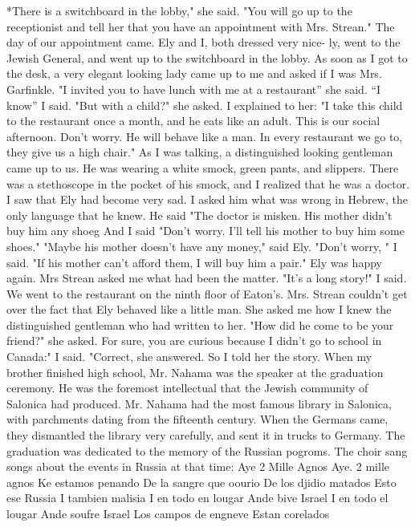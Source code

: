 *There is a switchboard in the lobby," she said. "You will go up 
to the receptionist and tell her that you have an appointment with Mrs. 
Strean." 
The day of our appointment came. Ely and I, both dressed very nice-
ly, went to the Jewish General, and went up to the switchboard in the 
lobby. As soon as I got to the desk, a very elegant looking lady came 
up to me and asked if I was Mrs. Garfinkle. 
"I invited you to have lunch with me at a restaurant” she said.
“I know” I said.
"But with a child?" she asked. 
I explained to her: "I take this child to the restaurant once a 
month, and he eats like an adult. This is our social afternoon. Don't 
worry. He will behave like a man. In every restaurant we go to, they 
give us a high chair." 
As I was talking, a distinguished looking gentleman came up to us.
He was wearing a white smock, green pants, and slippers. There was a 
stethoscope in the pocket of his smock, and I realized that he was a 
doctor. 
I saw that Ely had become very sad. I asked him what was wrong in 
Hebrew, the only language that he knew. 
He said "The doctor is misken. His mother didn't buy him any shoeg 
And I said "Don't worry. I'll tell his mother to buy him some 
shoes." 
"Maybe his mother doesn't have any money," said Ely. 
"Don't worry, " I said. "If his mother can't afford them, I will 
buy him a pair." Ely was happy again. Mrs Strean asked me what had been 
the matter. "It's a long story!" I said. 
We went to the restaurant on the ninth floor of Eaton's. Mrs. 
Strean couldn't get over the fact that Ely behaved like a little man. 
She asked me how I knew the distinguished gentleman who had written to 
her. "How did he come to be your friend?" she asked. 
For sure, you are curious because I didn't go to school in Canada:" I said. 
"Correct, she answered. 
So I told her the story. When my brother finished high school, Mr. 
Nahama was the speaker at the graduation ceremony. He was the foremost 
intellectual that the Jewish community of Salonica had produced. Mr. 
Nahama had the most famous library in Salonica, with parchments dating 
from the fifteenth century. When the Germans came, they dismantled the 
library very carefully, and sent it in trucks to Germany. 
The graduation was dedicated to the memory of the Russian pogroms. 
The choir sang songs about the events in Russia at that time: 
Aye 2 Mille Agnos 
Aye. 2 mille agnos 
Ke estamos penando 
De la sangre que oourio 
De los djidio matados 
Esto ese Russia 
I tambien malisia 
I en todo en lougar 
Ande bive Israel 
I en todo el lougar 
Ande soufre Israel 
Los campos de engneve 
Estan corelados 
